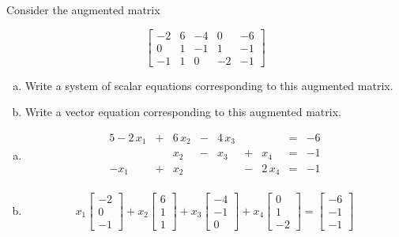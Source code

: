 
\begin{exerciseStatement}


 Consider the augmented matrix 

\[ \left[\begin{array}{cccc|c}
-2 & 6 & -4 & 0 & -6 \\
0 & 1 & -1 & 1 & -1 \\
-1 & 1 & 0 & -2 & -1
\end{array}\right] \]
\begin{enumerate}[(a)]
\item  Write a system of scalar equations corresponding to this augmented matrix. 
\item  Write a vector equation corresponding to this augmented matrix. 
\end{enumerate}
    
\end{exerciseStatement}
    
\begin{exerciseAnswer} 

\begin{enumerate}[(a)]
\item 
\begin{alignat*}{5} -2 \, x_{1} &+& 6 \, x_{2} &-& 4 \, x_{3} & &  &=& -6 \\ & & x_{2} &-& x_{3} &+& x_{4} &=& -1 \\-x_{1} &+& x_{2} & &  &-& 2 \, x_{4} &=& -1 \\ \end{alignat*}
            
\item \[ x_{1} \left[\begin{array}{c}
-2 \\
0 \\
-1
\end{array}\right] + x_{2} \left[\begin{array}{c}
6 \\
1 \\
1
\end{array}\right] + x_{3} \left[\begin{array}{c}
-4 \\
-1 \\
0
\end{array}\right] + x_{4} \left[\begin{array}{c}
0 \\
1 \\
-2
\end{array}\right] = \left[\begin{array}{c}
-6 \\
-1 \\
-1
\end{array}\right] \]
\end{enumerate}
    
\end{exerciseAnswer}
    
